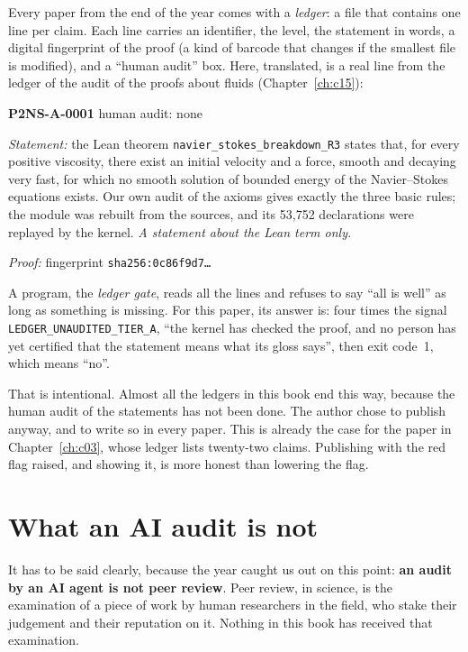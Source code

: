 Every paper from the end of the year comes with a \emph{ledger}: a file that contains one line per claim. Each line
carries an identifier, the level, the statement in words, a digital fingerprint of the proof (a kind of barcode that
changes if the smallest file is modified), and a ``human audit'' box. Here, translated, is a real line from the
ledger of the audit of the proofs about fluids (Chapter~\ref{ch:c15}):

\begin{encadre}
\small
\textsf{\textbf{P2NS-A-0001}} \quad {} \quad \textsf{human audit: none}\par\smallskip
\emph{Statement:} the Lean theorem \texttt{navier\_stokes\_breakdown\_R3} states that, for every positive viscosity,
there exist an initial velocity and a force, smooth and decaying very fast, for which no smooth solution of bounded
energy of the Navier--Stokes equations exists. Our own audit of the axioms gives exactly the three basic rules; the
module was rebuilt from the sources, and its 53,752 declarations were replayed by the kernel. \emph{A statement about
the Lean term only.}\par\smallskip
\emph{Proof:} fingerprint \texttt{sha256:0c86f9d7\dots}
\end{encadre}

A program, the \emph{ledger gate}, reads all the lines and refuses to say ``all is well'' as long as something is
missing. For this paper, its answer is: four times the signal \texttt{LEDGER\_UNAUDITED\_TIER\_A}, ``the kernel has
checked the proof, and no person has yet certified that the statement means what its gloss says'', then exit
code~1, which means ``no''.

That is intentional. Almost all the ledgers in this book end this way, because the human audit of the statements has
not been done. The author chose to publish anyway, and to write so in every paper. This is already the case for the
paper in Chapter~\ref{ch:c03}, whose ledger lists twenty-two claims. Publishing with the red flag raised, and showing
it, is more honest than lowering the flag.

\section{What an AI audit is not}

It has to be said clearly, because the year caught us out on this point: \textbf{an audit by an AI agent is not peer
review}. Peer review, in science, is the examination of a piece of work by human researchers in the field, who stake
their judgement and their reputation on it. Nothing in this book has received that examination.

